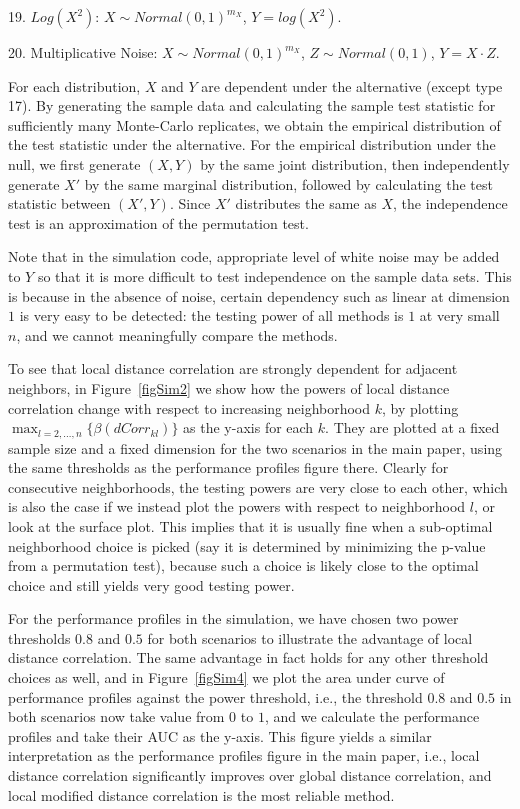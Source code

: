 \documentclass[12pt]{article}
\begin{document}
19. $Log(X^2)$: $X \sim Normal(0, 1)^{m_{X}}$, $Y=log(X^2)$.

20. Multiplicative Noise: $X \sim Normal(0, 1)^{m_{X}}$, $Z \sim Normal(0, 1)$, $Y=X \cdot Z$.

For each distribution, $X$ and $Y$ are dependent under the alternative (except type 17). By generating the sample data and calculating the sample test statistic for sufficiently many Monte-Carlo replicates, we obtain the empirical distribution of the test statistic under the alternative. For the empirical distribution under the null, we first generate $(X,Y)$ by the same joint distribution, then independently generate $X'$ by the same marginal distribution, followed by calculating the test statistic between $(X',Y)$. Since $X'$ distributes the same as $X$, the independence test is an approximation of the permutation test.

Note that in the simulation code, appropriate level of white noise may be added to $Y$ so that it is more difficult to test independence on the sample data sets. This is because in the absence of noise, certain dependency such as linear at dimension $1$ is very easy to be detected: the testing power of all methods is $1$ at very small $n$, and we cannot meaningfully compare the methods.

To see that local distance correlation are strongly dependent for adjacent neighbors, in Figure~\ref{figSim2} we show how the powers of local distance correlation change with respect to increasing neighborhood $k$, by plotting $\max_{l=2,\ldots,n} \{\beta(dCorr_{kl})\}$ as the y-axis for each $k$. They are plotted at a fixed sample size and a fixed dimension for the two scenarios in the main paper, using the same thresholds as the performance profiles figure there. Clearly for consecutive neighborhoods, the testing powers are very close to each other, which is also the case if we instead plot the powers with respect to neighborhood $l$, or look at the surface plot. This implies that it is usually fine when a sub-optimal neighborhood choice is picked (say it is determined by minimizing the p-value from a permutation test), because such a choice is likely close to the optimal choice and still yields very good testing power.

For the performance profiles in the simulation, we have chosen two power thresholds $0.8$ and $0.5$ for both scenarios to illustrate the advantage of local distance correlation. The same advantage in fact holds for any other threshold choices as well, and in Figure~\ref{figSim4} we plot the area under curve of performance profiles against the power threshold, i.e., the threshold $0.8$ and $0.5$ in both scenarios now take value from $0$ to $1$, and we calculate the performance profiles and take their AUC as the y-axis. This figure yields a similar interpretation as the performance profiles figure in the main paper, i.e., local distance correlation significantly improves over global distance correlation, and local modified distance correlation is the most reliable method.
\end{document}
